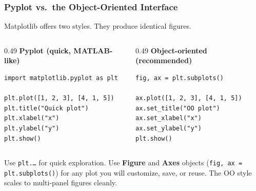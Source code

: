 \documentclass[aspectratio=169,10pt]{beamer}
\newcommand{\keyword}[1]{\textcolor{PrimaryBlue}{\textbf{#1}}}
\newcommand{\codeword}[1]{\texttt{#1}}
\newenvironment{bluebox}[1]{%
  \vspace{0.08cm}\begin{tcolorbox}[lecturebox,title={#1},fontupper=\small]%
}{\end{tcolorbox}\vspace{0.05cm}}
\begin{document}
\begin{frame}[fragile]
\frametitle{Pyplot vs.\ the Object-Oriented Interface}
\small
Matplotlib offers two styles. They produce identical figures.

\vspace{0.12cm}
\begin{columns}[T,totalwidth=0.98\textwidth]
\begin{column}{0.49\textwidth}
\textbf{Pyplot (quick, MATLAB-like)}
\begin{lstlisting}[style=pycodesmall]
import matplotlib.pyplot as plt

plt.plot([1, 2, 3], [4, 1, 5])
plt.title("Quick plot")
plt.xlabel("x")
plt.ylabel("y")
plt.show()
\end{lstlisting}
\end{column}
\begin{column}{0.49\textwidth}
\textbf{Object-oriented (recommended)}
\begin{lstlisting}[style=pycodesmall]
fig, ax = plt.subplots()

ax.plot([1, 2, 3], [4, 1, 5])
ax.set_title("OO plot")
ax.set_xlabel("x")
ax.set_ylabel("y")
plt.show()
\end{lstlisting}
\end{column}
\end{columns}

\vspace{0.15cm}
\begin{bluebox}{Which to use}
Use \codeword{plt.\dots} for quick exploration. Use \keyword{Figure} and \keyword{Axes} objects (\codeword{fig, ax = plt.subplots()}) for any plot you will customize, save, or reuse. The OO style scales to multi-panel figures cleanly.
\end{bluebox}
\end{frame}
\end{document}
